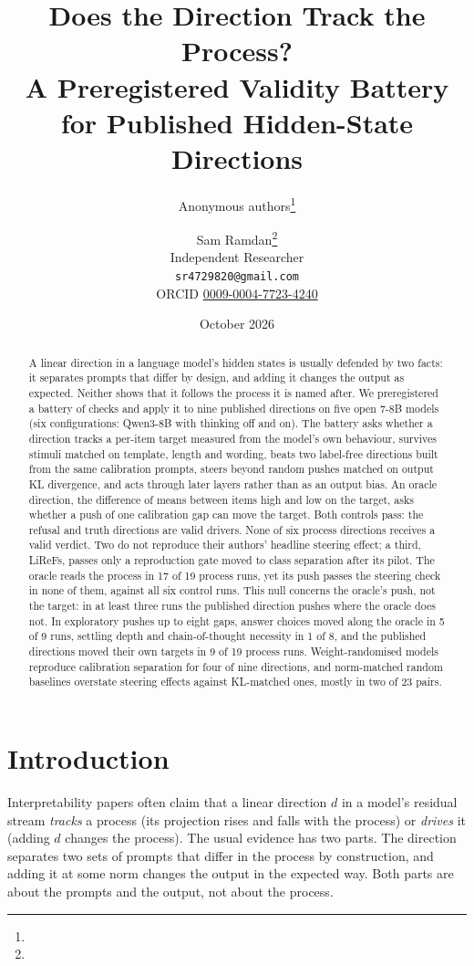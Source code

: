 \documentclass[11pt]{article}
\title{Does the Direction Track the Process?\\ A Preregistered Validity Battery for Published Hidden-State Directions}
\author{Anonymous authors\thanks{\aidisclosure}}
\author{
  Sam Ramdan\thanks{\aidisclosure}\\
  Independent Researcher\\
  \texttt{sr4729820@gmail.com}\\
  ORCID \href{https://orcid.org/0009-0004-7723-4240}{0009-0004-7723-4240}
}
\date{October 2026}
\begin{document}
\maketitle

\begin{abstract}
A linear direction in a language model's hidden states is usually defended by two facts: it separates prompts that differ by design, and adding it changes the output as expected. Neither shows that it follows the process it is named after. We preregistered a battery of checks and apply it to nine published directions on five open 7-8B models (six configurations: Qwen3-8B with thinking off and on). The battery asks whether a direction tracks a per-item target measured from the model's own behaviour, survives stimuli matched on template, length and wording, beats two label-free directions built from the same calibration prompts, steers beyond random pushes matched on output KL divergence, and acts through later layers rather than as an output bias. An oracle direction, the difference of means between items high and low on the target, asks whether a push of one calibration gap can move the target. Both controls pass: the refusal and truth directions are valid drivers. None of six process directions receives a valid verdict. Two do not reproduce their authors' headline steering effect; a third, LiReFs, passes only a reproduction gate moved to class separation after its pilot. The oracle reads the process in 17 of 19 process runs, yet its push passes the steering check in none of them, against all six control runs. This null concerns the oracle's push, not the target: in at least three runs the published direction pushes where the oracle does not. In exploratory pushes up to eight gaps, answer choices moved along the oracle in 5 of 9 runs, settling depth and chain-of-thought necessity in 1 of 8, and the published directions moved their own targets in 9 of 19 process runs. Weight-randomised models reproduce calibration separation for four of nine directions, and norm-matched random baselines overstate steering effects against KL-matched ones, mostly in two of 23 pairs.
\end{abstract}

\section{Introduction}

Interpretability papers often claim that a linear direction $d$ in a model's residual stream \emph{tracks} a process (its projection rises and falls with the process) or \emph{drives} it (adding $d$ changes the process). The usual evidence has two parts. The direction separates two sets of prompts that differ in the process by construction, and adding it at some norm changes the output in the expected way. Both parts are about the prompts and the output, not about the process.
\end{document}
